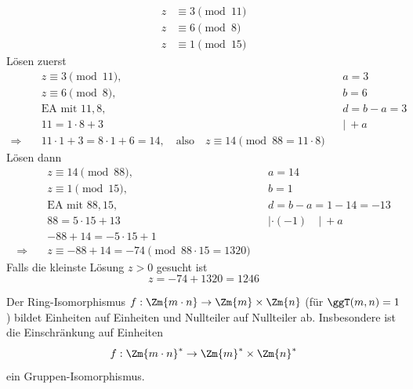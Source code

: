 \begin{beispiel}
\begin{align*}
z &\equiv 3 \pmod{11} \\
z &\equiv 6 \pmod{8} \\
z &\equiv 1 \pmod{15}
\end{align*}
Lösen zuerst
\begin{align*}
&z \equiv 3 \pmod{11}, && a = 3 \\
&z \equiv 6 \pmod{8}, && b = 6 \\
&\text{EA mit } 11, 8, && d = b - a = 3 \\
&11 = 1 \cdot 8 + 3 && |\ + a \\
\Rightarrow\quad &11 \cdot 1 + 3 = 8 \cdot 1 + 6 = 14, \quad \text{also} \quad z \equiv 14 \pmod{88 = 11 \cdot 8}
\end{align*}
Lösen dann
\begin{align*}
&z \equiv 14 \pmod{88}, && a = 14 \\
&z \equiv 1 \pmod{15}, && b = 1 \\
&\text{EA mit } 88, 15, && d = b - a = 1 - 14 = -13 \\
&88 = 5 \cdot 15 + 13 && |\cdot(-1) \quad |\ + a \\
&-88 + 14 = -5 \cdot 15 + 1 \\
\Rightarrow\quad &z \equiv -88 + 14 = -74 \pmod{88 \cdot 15 = 1320}
\end{align*}
Falls die kleinste Lösung $z > 0$ gesucht ist
\[ z = -74 + 1320 = 1246 \]
\end{beispiel}

\begin{bemerkung}
Der Ring-Isomorphismus $f : \Zm{m \cdot n} \to \Zm{m} \times \Zm{n}$ (für $\ggT(m, n) = 1$) bildet Einheiten auf Einheiten und Nullteiler auf Nullteiler ab. Insbesondere ist die Einschränkung auf Einheiten
\[ f : \Zm{m \cdot n}^* \to \Zm{m}^* \times \Zm{n}^* \]
ein Gruppen-Isomorphismus.
\end{bemerkung}
